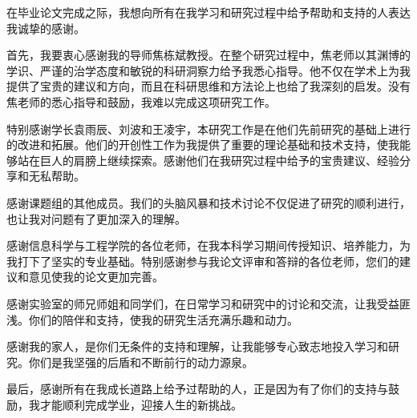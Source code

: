 \documentclass[AutoFakeBold]{LZUThesis}
\begin{document}
\backmatter
\printbib




\Thanks

在毕业论文完成之际，我想向所有在我学习和研究过程中给予帮助和支持的人表达我诚挚的感谢。

首先，我要衷心感谢我的导师焦栋斌教授。在整个研究过程中，焦老师以其渊博的学识、严谨的治学态度和敏锐的科研洞察力给予我悉心指导。他不仅在学术上为我提供了宝贵的建议和方向，而且在科研思维和方法论上也给了我深刻的启发。没有焦老师的悉心指导和鼓励，我难以完成这项研究工作。

特别感谢学长袁雨辰、刘波和王凌宇，本研究工作是在他们先前研究的基础上进行的改进和拓展。他们的开创性工作为我提供了重要的理论基础和技术支持，使我能够站在巨人的肩膀上继续探索。感谢他们在我研究过程中给予的宝贵建议、经验分享和无私帮助。

感谢课题组的其他成员。我们的头脑风暴和技术讨论不仅促进了研究的顺利进行，也让我对问题有了更加深入的理解。

感谢信息科学与工程学院的各位老师，在我本科学习期间传授知识、培养能力，为我打下了坚实的专业基础。特别感谢参与我论文评审和答辩的各位老师，您们的建议和意见使我的论文更加完善。

感谢实验室的师兄师姐和同学们，在日常学习和研究中的讨论和交流，让我受益匪浅。你们的陪伴和支持，使我的研究生活充满乐趣和动力。

感谢我的家人，是你们无条件的支持和理解，让我能够专心致志地投入学习和研究。你们是我坚强的后盾和不断前行的动力源泉。

最后，感谢所有在我成长道路上给予过帮助的人，正是因为有了你们的支持与鼓励，我才能顺利完成学业，迎接人生的新挑战。

\Grade %
\end{document}
